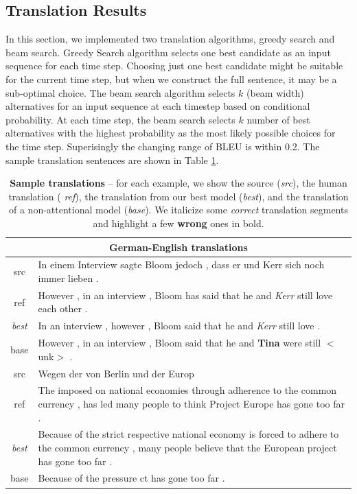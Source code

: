 \documentclass{article}
\begin{document}
\subsection{Translation Results}
In this section, we implemented two translation algorithms, greedy search and beam search. 
Greedy Search algorithm selects one best candidate as an input sequence for each time step. Choosing just one best candidate might be suitable for the current time step, but when we construct the full sentence, it may be a sub-optimal choice.
The beam search algorithm selects $k$ (beam width) alternatives for an input sequence at each timestep based on conditional probability. At each time step, the beam search selects $k$ number of best alternatives with the highest probability as the most likely possible choices for the time step.
Superisingly the changing range of BLEU is within 0.2. The sample translation sentences are shown in Table \ref{t:sample}.


\begin{table}[h]
    \centering
    \begin{tabular}{c|p{15cm}}
    \multicolumn{2}{c}{{\bf German-English translations}}\\
      \hline
    src & In einem Interview sagte Bloom jedoch , dass er und Kerr sich noch immer lieben . \\
      \hline
    ref & However , in an interview , Bloom has said that he and \textit{Kerr} still love each other . \\
      \hline
    {\it best} & In an interview , however , Bloom said that he and \textit{Kerr} still love . \\
      \hline
    base & However , in an interview , Bloom said that he and \textbf{Tina} were still $<$unk$>$ . \\
      \hline
      \hline
    src & Wegen der von Berlin und der Europ \\ 
      \hline
    ref & The imposed on national economies through adherence to the common currency , has led many people to think Project Europe has gone too far .\\
      \hline
    {\it best} & Because of the strict 
    respective national economy is forced to adhere to the common currency , many
    people believe that the European project has gone too far . \\
      \hline
    base & Because of the pressure ct has gone too far .\\
    \end{tabular}
    \caption{{\bf Sample translations} -- %
    for each example, we show the source ({\it src}), the human translation ({\it
    ref}), the translation from our best model ({\it best}), and the
    translation of a non-attentional model ({\it base}).  We italicize some
    \textit{correct} translation segments and highlight a few \textbf{wrong} ones in
    bold.} %
    \label{t:sample}
\end{table}
\end{document}
